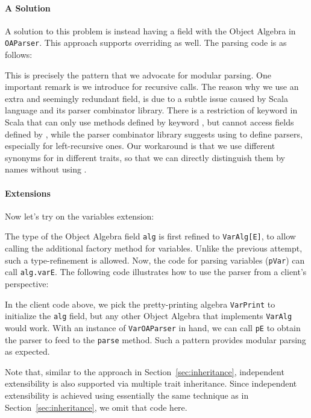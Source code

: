 \paragraph{A Solution}
A solution to this problem is instead having a field with the Object Algebra
in \lstinline{OAParser}. This approach supports overriding as well.
The parsing code is as follows:

This is precisely the pattern that we advocate for modular parsing.
One important remark is we introduce  for recursive calls.
The reason why we use an extra and seemingly redundant field, is due to a subtle issue caused by Scala language and its parser combinator library. There is a restriction of  keyword in Scala that  can only use methods defined by keyword , but cannot access fields defined by , while the parser combinator library suggests using  to define parsers, especially for left-recursive ones. Our workaround is that we use different synonyms for  in different traits, so that we can directly distinguish them by names without using .

\paragraph{Extensions}
Now let's try on the variables extension:


\noindent The type of the Object Algebra field \lstinline{alg} is first refined
to \lstinline{VarAlg[E]}, to allow calling the additional factory method
for variables. Unlike the previous attempt, such a type-refinement is allowed.
Now, the code for parsing variables (\lstinline{pVar}) can
call \lstinline{alg.varE}. The following code illustrates how to use
the parser from a client's perspective:


In the client code above,
we pick the pretty-printing algebra \lstinline{VarPrint} to initialize the \lstinline{alg} field, but any other Object
Algebra that implements \lstinline{VarAlg} would work.
With an instance of \lstinline{VarOAParser} in hand, we can call
\lstinline{pE} to obtain the parser to feed to the \lstinline{parse} method.
Such a pattern provides modular parsing as expected.

Note that, similar to the approach in Section~\ref{sec:inheritance}, independent extensibility is also supported via multiple trait inheritance.
Since independent extensibility is achieved using essentially the same technique as in Section~\ref{sec:inheritance}, we omit that code here.
